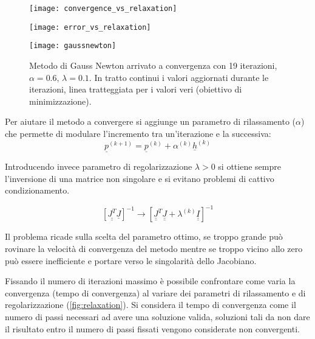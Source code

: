 \begin{figure*}[bt]
	\begin{subfigure}{0.5\linewidth}
			\centering
		\texttt{[image: convergence\_vs\_relaxation]}
		\caption{}
	\end{subfigure}\hfill
	\begin{subfigure}{0.5\linewidth}
			\centering
		\texttt{[image: error\_vs\_relaxation]}
		\caption{}
	\end{subfigure}
	\caption{Effetto del parametro di rilassamento sul metodo di Gauss-Newton. In (a) si vede come più il parametro è piccolo più il metodo converge lentamente.}
	\label{fig:relaxation}
\end{figure*}

\begin{figure}[bt]
	\centering
	\texttt{[image: gaussnewton]}
	\caption{Metodo di Gauss Newton arrivato a convergenza con 19 iterazioni, $\alpha=0.6$, $\lambda=0.1$. In tratto continui i valori aggiornati durante le iterazioni, linea tratteggiata per i valori veri (obiettivo di minimizzazione).}
\end{figure}



Per aiutare il metodo a convergere si aggiunge un parametro di rilassamento ($\alpha$) che permette di modulare l'incremento tra un'iterazione e la successiva:
\begin{equation}
\underline{p}^{(k+1)}=\underline{p}^{(k)}+\alpha^{(k)} \underline{h}^{(k)}
\end{equation}

Introducendo invece parametro di regolarizzazione $\lambda >0$ si ottiene sempre l'inversione di una matrice non singolare \cite{nocedal_numerical_2006} e si evitano problemi di cattivo condizionamento. 

\begin{equation}
\left[\underline{\underline{J^{T}}} \underline{J}\right]^{-1} \longrightarrow \left[\underline{\underline{J}}^{T} \underline{\underline{J}}+\lambda^{(k)} \underline{\underline{I}}\right]^{-1}
\end{equation}



Il problema ricade sulla scelta del parametro ottimo, se troppo grande può rovinare la velocità di convergenza del metodo mentre se troppo vicino allo zero può essere inefficiente e portare verso le singolarità dello Jacobiano. 

Fissando il numero di iterazioni massimo è possibile confrontare come varia la convergenza (tempo di convergenza) al variare dei parametri di rilassamento e di regolarizzazione (\cref{fig:relaxation}). Si considera il tempo di convergenza come il numero di passi necessari ad avere una soluzione valida, soluzioni tali da non dare il risultato entro il numero di passi fissati vengono considerate non convergenti.

